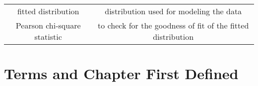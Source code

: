 \documentclass[]{book}
\begin{document}
\begin{longtable}[]{@{}cc@{}}
\begin{minipage}[t]{0.43\columnwidth}
fitted distribution\strut
\end{minipage} & \begin{minipage}[t]{0.43\columnwidth}\centering\strut
distribution used for modeling the data\strut
\end{minipage}\tabularnewline
\begin{minipage}[t]{0.43\columnwidth}\centering\strut
Pearson chi-square statistic\strut
\end{minipage} & \begin{minipage}[t]{0.43\columnwidth}\centering\strut
to check for the goodness of fit of the fitted distribution\strut
\end{minipage}\tabularnewline
\bottomrule
\end{longtable}

\chapter{Terms and Chapter First
Defined}\label{terms-and-chapter-first-defined}
\end{document}
